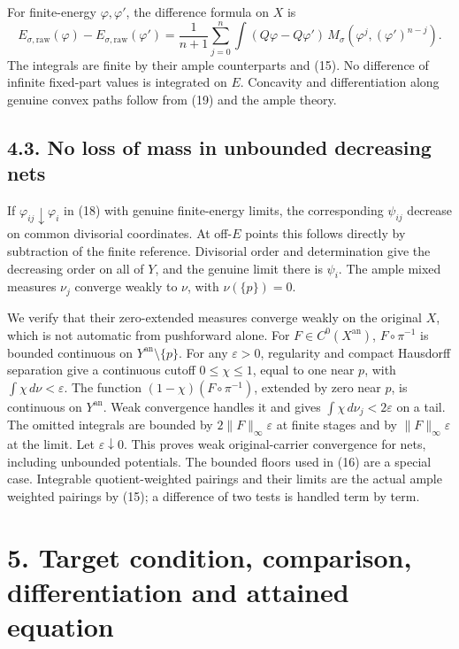 \documentclass[
  10pt,
]{article}
\begin{document}
For finite-energy \(\varphi,\varphi'\), the difference formula on \(X\)
is \[
 E_{\sigma,\mathrm{raw}}(\varphi)-E_{\sigma,\mathrm{raw}}(\varphi')
 =\frac1{n+1}\sum_{j=0}^n
  \int (Q\varphi-Q\varphi')\,
       M_\sigma(\varphi^j,(\varphi')^{n-j}).
 \tag{19}
\] The integrals are finite by their ample counterparts and (15). No
difference of infinite fixed-part values is integrated on \(E\).
Concavity and differentiation along genuine convex paths follow from
(19) and the ample theory.

\subsection{4.3. No loss of mass in unbounded decreasing
nets}\label{no-loss-of-mass-in-unbounded-decreasing-nets}

If \(\varphi_{ij}\downarrow\varphi_i\) in (18) with genuine
finite-energy limits, the corresponding \(\psi_{ij}\) decrease on common
divisorial coordinates. At off-\(E\) points this follows directly by
subtraction of the finite reference. Divisorial order and determination
give the decreasing order on all of \(Y\), and the genuine limit there
is \(\psi_i\). The ample mixed measures \(\nu_j\) converge weakly to
\(\nu\), with \(\nu(\{p\})=0\).

We verify that their zero-extended measures converge weakly on the
original \(X\), which is not automatic from pushforward alone. For
\(F\in C^0(X^{\mathrm{an}})\), \(F\circ\pi^{-1}\) is bounded continuous
on \(Y^{\mathrm{an}}\setminus\{p\}\). For any \(\varepsilon>0\),
regularity and compact Hausdorff separation give a continuous cutoff
\(0\le\chi\le1\), equal to one near \(p\), with
\(\int\chi\,d\nu<\varepsilon\). The function
\((1-\chi)(F\circ\pi^{-1})\), extended by zero near \(p\), is continuous
on \(Y^{\mathrm{an}}\). Weak convergence handles it and gives
\(\int\chi\,d\nu_j<2\varepsilon\) on a tail. The omitted integrals are
bounded by \(2\|F\|_\infty\varepsilon\) at finite stages and by
\(\|F\|_\infty\varepsilon\) at the limit. Let
\(\varepsilon\downarrow0\). This proves weak original-carrier
convergence for nets, including unbounded potentials. The bounded floors
used in (16) are a special case. Integrable quotient-weighted pairings
and their limits are the actual ample weighted pairings by (15); a
difference of two tests is handled term by term.

\section{5. Target condition, comparison, differentiation and attained
equation}\label{target-condition-comparison-differentiation-and-attained-equation}
\end{document}
